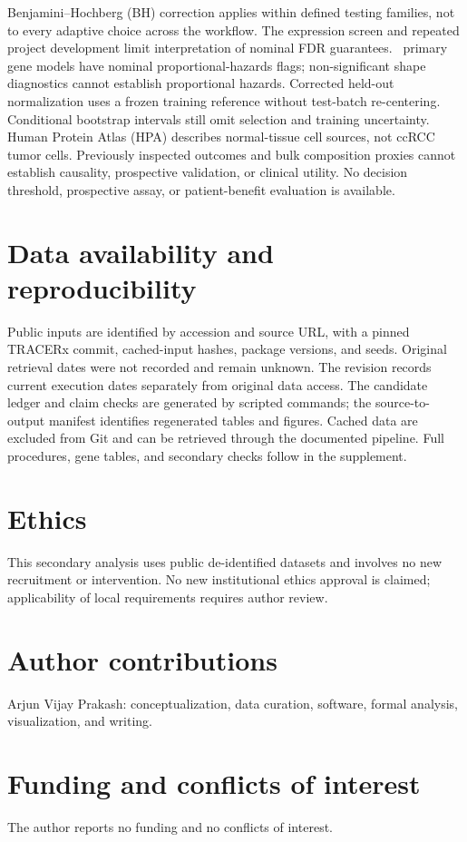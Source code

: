 \documentclass{article}
\begin{document}
Benjamini--Hochberg (BH) correction applies within defined testing families, not to every adaptive choice across the workflow. The expression screen and repeated project development limit interpretation of nominal FDR guarantees. \ReviewPhFlags\ primary gene models have nominal proportional-hazards flags; non-significant shape diagnostics cannot establish proportional hazards. Corrected held-out normalization uses a frozen training reference without test-batch re-centering. Conditional bootstrap intervals still omit selection and training uncertainty. Human Protein Atlas (HPA) describes normal-tissue cell sources, not ccRCC tumor cells. Previously inspected outcomes and bulk composition proxies cannot establish causality, prospective validation, or clinical utility. No decision threshold, prospective assay, or patient-benefit evaluation is available.

\section*{Data availability and reproducibility}
Public inputs are identified by accession and source URL, with a pinned TRACERx commit, cached-input hashes, package versions, and seeds. Original retrieval dates were not recorded and remain unknown. The revision records current execution dates separately from original data access. The candidate ledger and claim checks are generated by scripted commands; the source-to-output manifest identifies regenerated tables and figures. Cached data are excluded from Git and can be retrieved through the documented pipeline. Full procedures, gene tables, and secondary checks follow in the supplement.

\section*{Ethics}
This secondary analysis uses public de-identified datasets and involves no new recruitment or intervention. No new institutional ethics approval is claimed; applicability of local requirements requires author review.

\section*{Author contributions}
Arjun Vijay Prakash: conceptualization, data curation, software, formal analysis, visualization, and writing.

\section*{Funding and conflicts of interest}
The author reports no funding and no conflicts of interest.
\end{document}
